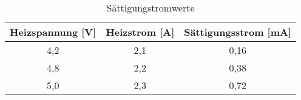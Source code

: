 \begin{table}[h]
	\begin{center}
		\begin{tabular}{ccc}
			Heizspannung [V] & Heizstrom [A] & Sättigungsstrom [mA]\\ \hline
			4,2 &2,1 &0,16\\
			4,8 &2,2 &0,38\\
			5,0 &2,3 &0,72
		\end{tabular}
		\caption{Sättigungstromwerte}
		\label{tabis}
	\end{center}
\end{table}